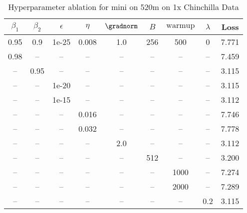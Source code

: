 \begin{table}[h!]
\centering
\caption{Hyperparameter ablation for mini on 520m on 1x Chinchilla Data}
\label{tab:ablation_mini_520m_on_1x_chinchilla_data}
\begin{tabular}{ccccccccc}
\toprule
$\beta_1$ & $\beta_2$ & $\epsilon$ & $\eta$ & $\gradnorm$ & $B$ & $\mathrm{warmup}$ & $\lambda$ & Loss \\
\midrule
0.95 & 0.9 & 1e-25 & 0.008 & 1.0 & 256 & 500 & 0 & 7.771 \\
\midrule
0.98 & -- & -- & -- & -- & -- & -- & -- & 7.459 \\
-- & 0.95 & -- & -- & -- & -- & -- & -- & 3.115 \\
-- & -- & 1e-20 & -- & -- & -- & -- & -- & 3.115 \\
-- & -- & 1e-15 & -- & -- & -- & -- & -- & 3.112 \\
-- & -- & -- & 0.016 & -- & -- & -- & -- & 7.746 \\
-- & -- & -- & 0.032 & -- & -- & -- & -- & 7.778 \\
-- & -- & -- & -- & 2.0 & -- & -- & -- & 3.112 \\
-- & -- & -- & -- & -- & 512 & -- & -- & 3.200 \\
-- & -- & -- & -- & -- & -- & 1000 & -- & 7.274 \\
-- & -- & -- & -- & -- & -- & 2000 & -- & 7.289 \\
-- & -- & -- & -- & -- & -- & -- & 0.2 & 3.115 \\
\bottomrule
\end{tabular}
\end{table}

